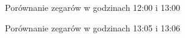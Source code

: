 \documentclass[12pt,a4paper]{article}
\begin{document}
            \begin{figure}
                \hfill
                \hfill
                \hfill
                \caption{Porównanie zegarów w godzinach 12:00 i 13:00}
            \end{figure}
            
                        \begin{figure}
                \hfill
                \hfill
                \hfill
                \caption{Porównanie zegarów w godzinach 13:05 i 13:06}
            \end{figure}
            
\end{document}
